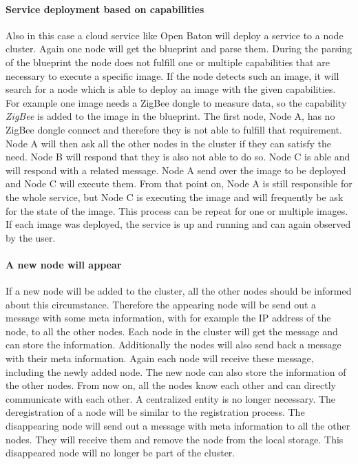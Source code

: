 \paragraph{Service deployment based on capabilities}
Also in this case a cloud service like Open Baton will deploy a service to a node cluster.
Again one node will get the blueprint and parse them.
During the parsing of the blueprint the node does not fulfill one or multiple capabilities that are necessary to execute a specific image.
If the node detects such an image, it will search for a node which is able to deploy an image with the given capabilities.
For example one image needs a ZigBee dongle to measure data, so the capability \textit{ZigBee} is added to the image in the blueprint.
The first node, Node A, has no ZigBee dongle connect and therefore they is not able to fulfill that requirement.
Node A will then ask all the other nodes in the cluster if they can satisfy the need.
Node B will respond that they is also not able to do so.
Node C is able and will respond with a related message.
Node A send over the image to be deployed and Node C will execute them.
From that point on, Node A is still responsible for the whole service, but Node C is executing the image and will frequently be ask for the state of the image.
This process can be repeat for one or multiple images.
If each image was deployed, the service is up and running and can again observed by the user.

\paragraph{A new node will appear}
If a new node will be added to the cluster, all the other nodes should be informed about this circumstance.
Therefore the appearing node will be send out a message with some meta information, with for example the \ac{IP} address of the node, to all the other nodes.
Each node in the cluster will get the message and can store the information.
Additionally the nodes will also send back a message with their meta information.
Again each node will receive these message, including the newly added node.
The new node can also store the information of the other nodes.
From now on, all the nodes know each other and can directly communicate with each other.
A centralized entity is no longer necessary.
The deregistration of a node will be similar to the registration process.
The disappearing node will send out a message with meta information to all the other nodes.
They will receive them and remove the node from the local storage.
This disappeared node will no longer be part of the cluster.

